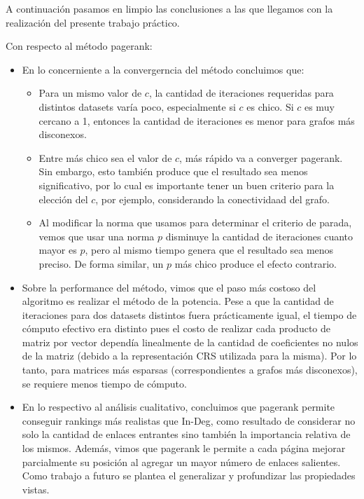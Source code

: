 A continuación pasamos en limpio las conclusiones a las que llegamos con la realización del presente trabajo práctico.

Con respecto al método pagerank:
\begin{itemize}
	\item En lo concerniente a la convergerncia del método concluimos que:
		\begin{itemize}
			\item Para un mismo valor de $c$, la cantidad de iteraciones requeridas para distintos datasets varía poco, especialmente si $c$ es chico. Si $c$ es muy cercano a 1, entonces la cantidad de iteraciones es menor para grafos más disconexos.
			\item Entre más chico sea el valor de $c$, más rápido va a converger pagerank. Sin embargo, esto también produce que el resultado sea menos significativo, por lo cual es importante tener un buen criterio para la elección del $c$, por ejemplo, considerando la conectividaad del grafo.
			\item Al modificar la norma que usamos para determinar el criterio de parada, vemos que usar una norma $p$ disminuye la cantidad de iteraciones cuanto mayor es $p$, pero al mismo tiempo genera que el resultado sea menos preciso. De forma similar, un $p$ más chico produce el efecto contrario.
		\end{itemize}
	\item Sobre la performance del método, vimos que el paso más costoso del algoritmo es realizar el método de la potencia. Pese a que la cantidad de iteraciones para dos datasets distintos fuera prácticamente igual, el tiempo de cómputo efectivo era distinto pues el costo de realizar cada producto de matriz por vector dependía linealmente de la cantidad de coeficientes no nulos de la matriz (debido a la representación CRS utilizada para la misma). Por lo tanto, para matrices más esparsas (correspondientes a grafos más disconexos), se requiere menos tiempo de cómputo.
	\item En lo respectivo al análisis cualitativo, concluimos que pagerank permite conseguir rankings más realistas que In-Deg, como resultado de considerar no solo la cantidad de enlaces entrantes sino también la importancia relativa de los mismos. Además, vimos que pagerank le permite a cada página mejorar parcialmente su posición al agregar un mayor número de enlaces salientes. Como trabajo a futuro se plantea el generalizar y profundizar las propiedades vistas. 
\end{itemize}

